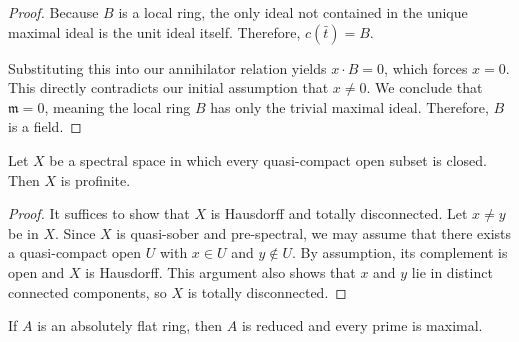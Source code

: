 \begin{proof}
    Because $B$ is a local ring, the only ideal not contained in the unique maximal ideal is the unit ideal itself. Therefore, $c(\bar{t}) = B$.

    Substituting this into our annihilator relation yields $x \cdot B = 0$, which forces $x = 0$. This directly contradicts our initial assumption that $x \neq 0$. We conclude that $\mathfrak{m} = 0$, meaning the local ring $B$ has only the trivial maximal ideal. Therefore, $B$ is a field.

\end{proof}



\begin{lemma}[\stacksproject{0905}]
    Let $X$ be a spectral space in which every quasi-compact open
    subset is closed. Then $X$ is profinite.
    \label{lemma:spectral-profinite}
    \leanok
\end{lemma}

\begin{proof}
    \leanok
    It suffices to show that $X$ is Hausdorff and totally disconnected.
    Let $x \neq y$ be in $X$. Since $X$ is quasi-sober and pre-spectral, we may assume
    that there exists a quasi-compact open $U$ with $x \in U$ and $y \not\in U$.
    By assumption, its complement is open and $X$ is Hausdorff. This
    argument also shows that $x$ and $y$ lie in distinct connected components, so
    $X$ is totally disconnected.
\end{proof}

\begin{lemma}[\stacksproject{092F} (2) => (3) (4)]
    \label{lem:reduced-prime-maximal-of-absolutely-flat}
    If $A$ is an absolutely flat ring, then $A$ is reduced and every prime is maximal.
    \leanok
\end{lemma}

